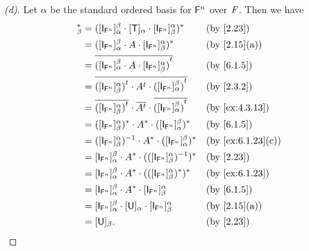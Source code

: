 \begin{proof}[(d)]
  Let \(\alpha\) be the standard ordered basis for \(\mathsf{F}^n\) over \(\mathit{F}\).
  Then we have
  \begin{align*}
    [\T]_{\beta}^* & = ([\IT[\vs{F}^n]]_{\alpha}^{\beta} \cdot [\T]_{\alpha} \cdot [\IT[\vs{F}^n]]_{\beta}^{\alpha})^*                         &  & \by{2.23}         \\
                   & = ([\IT[\vs{F}^n]]_{\alpha}^{\beta} \cdot A \cdot [\IT[\vs{F}^n]]_{\beta}^{\alpha})^*                                     &  & \by{2.15}[a]      \\
                   & = \conj{\tp{([\IT[\vs{F}^n]]_{\alpha}^{\beta} \cdot A \cdot [\IT[\vs{F}^n]]_{\beta}^{\alpha})}}                           &  & \by{6.1.5}        \\
                   & = \conj{\tp{([\IT[\vs{F}^n]]_{\beta}^{\alpha})} \cdot \tp{A} \cdot \tp{([\IT[\vs{F}^n]]_{\alpha}^{\beta})}}               &  & \by{2.3.2}        \\
                   & = \conj{\tp{([\IT[\vs{F}^n]]_{\beta}^{\alpha})}} \cdot \conj{\tp{A}} \cdot \conj{\tp{([\IT[\vs{F}^n]]_{\alpha}^{\beta})}} &  & \by{ex:4.3.13}    \\
                   & = ([\IT[\vs{F}^n]]_{\beta}^{\alpha})^* \cdot A^* \cdot ([\IT[\vs{F}^n]]_{\alpha}^{\beta})^*                               &  & \by{6.1.5}        \\
                   & = ([\IT[\vs{F}^n]]_{\beta}^{\alpha})^{-1} \cdot A^* \cdot ([\IT[\vs{F}^n]]_{\alpha}^{\beta})^*                            &  & \by{ex:6.1.23}[c] \\
                   & = [\IT[\vs{F}^n]]_{\alpha}^{\beta} \cdot A^* \cdot (([\IT[\vs{F}^n]]_{\beta}^{\alpha})^{-1})^*                            &  & \by{2.23}         \\
                   & = [\IT[\vs{F}^n]]_{\alpha}^{\beta} \cdot A^* \cdot (([\IT[\vs{F}^n]]_{\beta}^{\alpha})^*)^*                               &  & \by{ex:6.1.23}    \\
                   & = [\IT[\vs{F}^n]]_{\alpha}^{\beta} \cdot A^* \cdot [\IT[\vs{F}^n]]_{\beta}^{\alpha}                                       &  & \by{6.1.5}        \\
                   & = [\IT[\vs{F}^n]]_{\alpha}^{\beta} \cdot [\U]_{\alpha} \cdot [\IT[\vs{F}^n]]_{\beta}^{\alpha}                             &  & \by{2.15}[a]      \\
                   & = [\U]_{\beta}.                                                                                                           &  & \by{2.23}
  \end{align*}
\end{proof}

